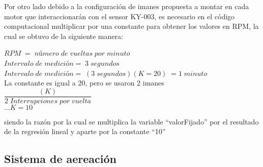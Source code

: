 \documentclass[11pt,letter
								]
								{article}
\begin{document}

Por otro lado debido a la configuración de imanes propuesta a montar en cada  motor que interaccionarán  con el sensor KY-003, es necesario en el código computacional multiplicar por  una constante para obtener los valores en RPM, la cual se obtuvo de la siguiente manera: 
\begin{center}
$RPM \;= \;n$ú$mero \;de \;vueltas\; por\; minuto$ \\[1cm]

$Intervalo \;de \;medici$ó$n =\; 3\; segundos$\\[1cm]

$Intervalo \;de \;medici$ó$n =\; (3\; segundos)  (K=20 ) \; = 1 \; minuto$\\[1cm]

La constante es igual a 20, pero se usaron 2 imanes \\[1cm]


$ \dfrac {(K)} {2 \; Interrupciones \; por\; vuelta  }  $\\[1cm]
$\dots K = 10   $


	\end{center}
siendo la razón por la cual se multiplica la variable ``valorFijado'' por el resultado de la regresión lineal y aparte por la constante ``10''

\newpage
\subsection {Sistema de aereación  }
	
\end{document}
